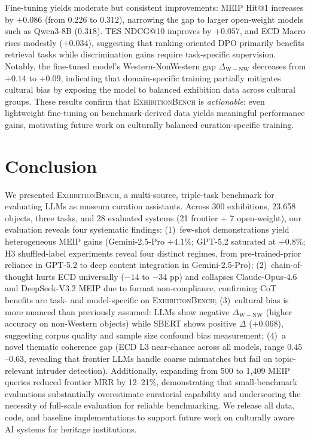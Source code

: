 \documentclass[11pt]{article}
\newcommand{\bench}{\textsc{ExhibitionBench}}
\newcommand{\ecd}{\textsc{ECD}}
\begin{document}
Fine-tuning yields moderate but consistent improvements: MEIP Hit@1 increases by $+0.086$ (from $0.226$ to $0.312$), narrowing the gap to larger open-weight models such as Qwen3-8B ($0.318$).
TES NDCG@10 improves by $+0.057$, and ECD Macro rises modestly ($+0.034$), suggesting that ranking-oriented DPO primarily benefits retrieval tasks while discrimination gains require task-specific supervision.
Notably, the fine-tuned model's Western-NonWestern gap $\Delta_{\mathrm{W{-}NW}}$ decreases from $+0.14$ to $+0.09$, indicating that domain-specific training partially mitigates cultural bias by exposing the model to balanced exhibition data across cultural groups.
These results confirm that \bench{} is \emph{actionable}: even lightweight fine-tuning on benchmark-derived data yields meaningful performance gains, motivating future work on culturally balanced curation-specific training.

\section{Conclusion}
\label{sec:conclusion}

We presented \bench{}, a multi-source, triple-task benchmark for
evaluating LLMs as museum curation assistants.
Across 300 exhibitions, 23{,}658 objects, three tasks,
and 28 evaluated systems (21 frontier + 7 open-weight),
our evaluation reveals four systematic findings:
(1)~few-shot demonstrations yield heterogeneous MEIP gains
(Gemini-2.5-Pro $+4.1\%$; GPT-5.2 saturated at $+0.8\%$;
H3 shuffled-label experiments reveal four distinct regimes, from
pre-trained-prior reliance in GPT-5.2 to deep content integration in Gemini-2.5-Pro);
(2)~chain-of-thought hurts ECD universally ($-14$ to $-34$ pp) and collapses
Claude-Opus-4.6 and DeepSeek-V3.2 MEIP due to format non-compliance,
confirming CoT benefits are task- and model-specific on \bench{};
(3)~cultural bias is more nuanced than previously assumed: LLMs show negative
$\Delta_{\mathrm{W{-}NW}}$ (higher accuracy on non-Western objects) while
SBERT shows positive $\Delta$ ($+0.068$), suggesting corpus quality and
sample size confound bias measurement;
(4)~a novel thematic coherence gap (\ecd{} L3 near-chance across all models, range $0.45$--$0.63$,
revealing that frontier LLMs handle coarse mismatches but fail on topic-relevant
intruder detection).
Additionally, expanding from 500 to 1{,}409 MEIP queries reduced frontier MRR by
12--21\%, demonstrating that small-benchmark evaluations substantially
overestimate curatorial capability and underscoring the necessity of
full-scale evaluation for reliable benchmarking.
We release all data, code, and baseline implementations to support
future work on culturally aware AI systems for heritage institutions.
\end{document}
